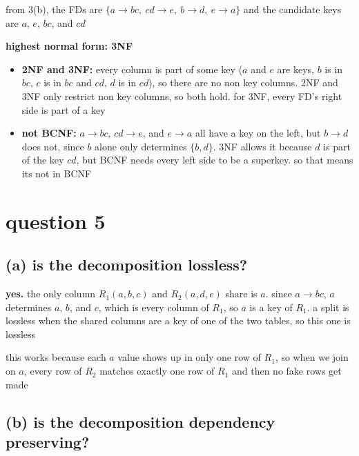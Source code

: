 \documentclass[11pt]{article}
\begin{document}
\noindent from 3(b), the FDs are $\{a \to bc,\ cd \to e,\ b \to d,\ e \to
a\}$ and the candidate keys are $a$, $e$, $bc$, and $cd$

\medskip
\noindent\textbf{highest normal form: 3NF}
\begin{itemize}
  \item \textbf{2NF and 3NF:} every column is part of some key ($a$ and $e$
    are keys, $b$ is in $bc$, $c$ is in $bc$ and $cd$, $d$ is in $cd$), so
    there are no non key columns. 2NF and 3NF only restrict non key columns,
    so both hold. for 3NF, every FD's right side is part of a key
  \item \textbf{not BCNF:} $a \to bc$, $cd \to e$, and $e \to a$ all have a
    key on the left, but $b \to d$ does not, since $b$ alone only determines
    $\{b,d\}$. 3NF allows it because $d$ is part of the key $cd$, but BCNF
    needs every left side to be a superkey. so that means its not in BCNF
\end{itemize}

\section*{question 5}

\subsection*{(a) is the decomposition lossless?}

\noindent\textbf{yes.} the only column $R_1(a,b,c)$ and $R_2(a,d,e)$ share is
$a$. since $a \to bc$, $a$ determines $a$, $b$, and $c$, which is every column
of $R_1$, so $a$ is a key of $R_1$. a split is lossless when the shared
columns are a key of one of the two tables, so this one is lossless

\medskip
\noindent this works because each $a$ value shows up in only one row of
$R_1$, so when we join on $a$, every row of $R_2$ matches exactly one row of
$R_1$ and then no fake rows get made

\subsection*{(b) is the decomposition dependency preserving?}
\end{document}
